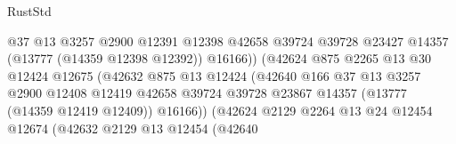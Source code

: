 \begin{lexlean}{RustStd}
\begin{coremodule}
                                            @37
                                            @13
                                            @3257
                                            @2900
                                            @12391
                                            @12398
                                            @42658
                                            @39724
                                            @39728
                                            @23427
                                            @14357
                                            (@13777 (@14359 @12398 @12392))
                                            @16166))
                                        (@42624
                                          @875
                                          @2265
                                          @13
                                          @30
                                          @12424
                                          @12675
                                          (@42632
                                            @875
                                            @13
                                            @12424
                                            (@42640
                                              @166
                                              @37
                                              @13
                                              @3257
                                              @2900
                                              @12408
                                              @12419
                                              @42658
                                              @39724
                                              @39728
                                              @23867
                                              @14357
                                              (@13777 (@14359 @12419 @12409))
                                              @16166))
                                          (@42624
                                            @2129
                                            @2264
                                            @13
                                            @24
                                            @12454
                                            @12674
                                            (@42632
                                              @2129
                                              @13
                                              @12454
                                              (@42640

\end{coremodule}
\end{lexlean}
